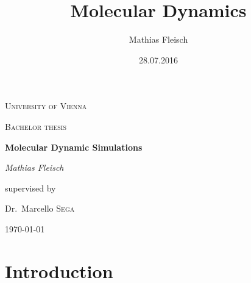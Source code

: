 \documentclass[a4paper]{article}
\title{Molecular Dynamics}
\date{28.07.2016}
\author{Mathias Fleisch}
\begin{document}
\begin{titlepage}
	\centering
	{\scshape\LARGE University of Vienna \par}
	\vspace{1cm}
	{\scshape\Large Bachelor thesis\par}
	\vspace{1.5cm}
	{\huge\bfseries Molecular Dynamic Simulations\par}
	\vspace{2cm}
	{\Large\itshape Mathias Fleisch\par}
	\vfill
	supervised by\par
	Dr.~Marcello \textsc{Sega}

	\vfill

	{\large \today\par}
\end{titlepage}

\newpage

\tableofcontents
\thispagestyle{empty}

\newpage
\setcounter{page}{1}

\section{Introduction}

\begin{comment}
This bachelor thesis presents different methods for improving the conformational search ability of Langevin dynamics (LD). All of these methods are based on the Langevin equation, the interaction between particles is approximated by the Lennard-Jones potential. For examples containing polymers, a simple model is used. The force between two connected particles is either mediated by a harmonic potential (Gaussian chain) or a FENE potential. Self guided Langevin dynamics (SGLD) adds an additional guiding force to the Langevin equation which accelerates low frequency motions and slows down high frequency motions. Low frequency motions are important for the conformational search ability. The strength of the guiding force is controlled by the guiding factor. SGLD has its own partition function and to perform measurements in a simulation, the values have to be rescaled. A widely used method for accelerating the conformational searching is parallel tempering, or replica exchange Langevin dynamics (RXLD). Replicas of the target system with higher temperatures are simulated parallel and configurations are periodically exchanged according to an exchange probability based on the Metropolis criterion. In contrast to high temperatures, SGLD causes less perturbation on conformational distribution. Therefore exchanges between different SGLD stages with distinct guiding forces are more likely. The base stage of such a replica exchange self guided Langevin dynamics simulation (RXSGLD) has no guiding force and hence generates the target ensemble. Especially for big systems the improvement due to the RXSGLD can be significant.
\end{comment}
\end{document}
